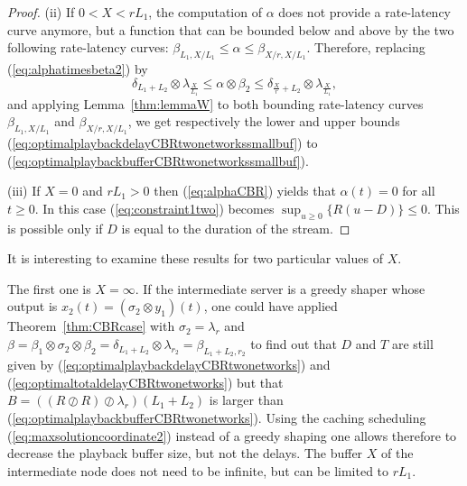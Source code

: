 \begin{proof}
\vspace{1ex}
\noindent
(ii) If $0 < X < rL_1$, the computation of $\alpha$ does not provide a rate-latency curve anymore,
but a function %
that can be bounded below and above by the
two following  rate-latency curves: $\beta_{L_1,X/L_1} \leq \alpha \leq \beta_{X/r,X/L_1}$.
Therefore, replacing (\ref{eq:alphatimesbeta2}) by
$$ \delta_{L_1+L_2} \otimes \lambda_{\frac{X}{L_1}} \leq \alpha \otimes \beta_2 \leq  \delta_{\frac{X}{r}+L_2} \otimes \lambda_{\frac{X}{L_1}}, $$
and applying Lemma~\ref{thm:lemmaW} to both bounding rate-latency curves $\beta_{L_1,X/L_1}$ and $\beta_{X/r,X/L_1}$, we get respectively the lower and upper bounds (\ref{eq:optimalplaybackdelayCBRtwonetworkssmallbuf}) to (\ref{eq:optimalplaybackbufferCBRtwonetworkssmallbuf}).

\vspace{1ex}
\noindent
(iii) If $X = 0$ and $rL_1 > 0$ then (\ref{eq:alphaCBR}) yields that $\alpha(t) = 0$ for all $t \geq 0$. In this case
(\ref{eq:constraint1two}) becomes
$ \sup_{u \geq 0} \{ R(u -D) \} \leq 0$. This is possible only if $D$ is equal to the duration of the stream.
\end{proof}


It is interesting to examine these results for two particular values of $X$.

The first one is $X = \infty$. If the intermediate server is a greedy shaper  whose output is $x_2(t) = (\sigma_2 \otimes y_1)(t)$,
one could have applied Theorem~\ref{thm:CBRcase} with $\sigma_2 = \lambda_r$ and $\beta = \beta_1 \otimes \sigma_2 \otimes \beta_2 = \delta_{L_1+L_2} \otimes \lambda_{r_2} = \beta_{L_1 + L_2,r_2}$ to find out that $D$ and $T$ are still given by (\ref{eq:optimalplaybackdelayCBRtwonetworks})
and (\ref{eq:optimaltotaldelayCBRtwonetworks}) but that $B = ((R \oslash R) \oslash \lambda_{r})(L_1 + L_2)$ is larger than (\ref{eq:optimalplaybackbufferCBRtwonetworks}). Using the caching scheduling (\ref{eq:maxsolutioncoordinate2}) instead of a greedy shaping one allows therefore to decrease the playback buffer size, but not the delays. The buffer $X$ of the intermediate node does not need to be infinite, but can be limited to $rL_1$.

